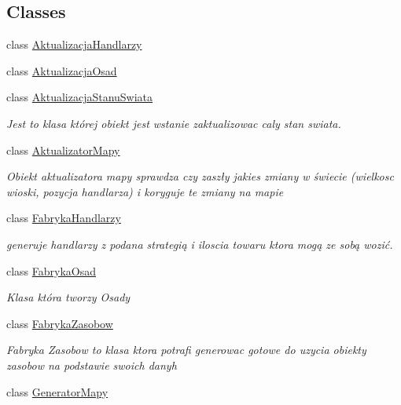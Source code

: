 \subsection*{Classes}
\begin{DoxyCompactItemize}
\item 
class \hyperlink{class_empire___simulator_1_1_aktualizacja_handlarzy}{Aktualizacja\+Handlarzy}
\item 
class \hyperlink{class_empire___simulator_1_1_aktualizacja_osad}{Aktualizacja\+Osad}
\item 
class \hyperlink{class_empire___simulator_1_1_aktualizacja_stanu_swiata}{Aktualizacja\+Stanu\+Swiata}
\begin{DoxyCompactList}\small\item\em Jest to klasa której obiekt jest wstanie zaktualizowac caly stan swiata. \end{DoxyCompactList}\item 
class \hyperlink{class_empire___simulator_1_1_aktualizator_mapy}{Aktualizator\+Mapy}
\begin{DoxyCompactList}\small\item\em Obiekt aktualizatora mapy sprawdza czy zaszły jakies zmiany w świecie (wielkosc wioski, pozycja handlarza) i koryguje te zmiany na mapie \end{DoxyCompactList}\item 
class \hyperlink{class_empire___simulator_1_1_fabryka_handlarzy}{Fabryka\+Handlarzy}
\begin{DoxyCompactList}\small\item\em generuje handlarzy z podana strategią i iloscia towaru ktora mogą ze sobą wozić. \end{DoxyCompactList}\item 
class \hyperlink{class_empire___simulator_1_1_fabryka_osad}{Fabryka\+Osad}
\begin{DoxyCompactList}\small\item\em Klasa która tworzy Osady \end{DoxyCompactList}\item 
class \hyperlink{class_empire___simulator_1_1_fabryka_zasobow}{Fabryka\+Zasobow}
\begin{DoxyCompactList}\small\item\em Fabryka Zasobow to klasa ktora potrafi generowac gotowe do uzycia obiekty zasobow na podstawie swoich danyh \end{DoxyCompactList}\item 
class \hyperlink{class_empire___simulator_1_1_generator_mapy}{Generator\+Mapy}

\end{DoxyCompactItemize}
